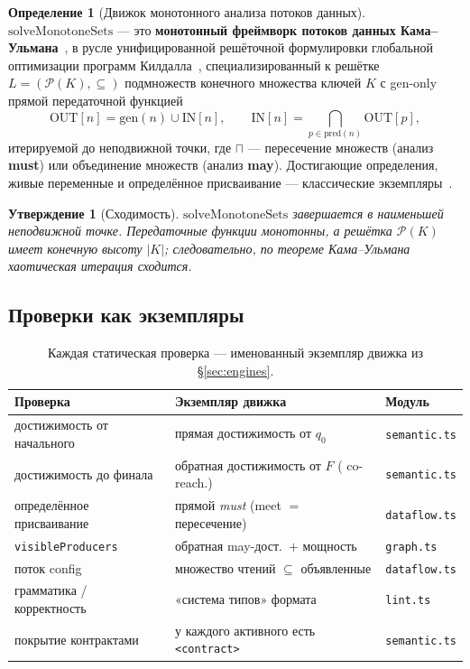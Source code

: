 \documentclass[11pt]{article}
\theoremstyle{plain}
\newtheorem{proposition}[theorem]{Утверждение}
\theoremstyle{definition}
\newtheorem{definition}[theorem]{Определение}
\theoremstyle{remark}
\newcommand{\code}[1]{\texttt{#1}}
\newcommand{\powerset}{\mathcal{P}}
\newcommand{\meet}{\sqcap}
\newcommand{\bigmeet}{\bigcap}
\begin{document}
\begin{definition}[Движок монотонного анализа потоков данных]\label{def:kamullman}
$\mathrm{solveMonotoneSets}$ --- это \textbf{монотонный фреймворк потоков данных
Кама--Ульмана}~\cite{kamullman}, в русле унифицированной решёточной формулировки
глобальной оптимизации программ Килдалла~\cite{kildall}, специализированный к решётке
$L = (\powerset(K), \subseteq)$ подмножеств конечного множества ключей $K$ с
gen-only прямой передаточной функцией
\[
  \mathrm{OUT}[n] = \mathrm{gen}(n) \cup \mathrm{IN}[n], \qquad
  \mathrm{IN}[n] = \!\!\bigmeet_{p \in \mathrm{pred}(n)}\!\! \mathrm{OUT}[p],
\]
итерируемой до неподвижной точки, где $\meet$ --- пересечение множеств (анализ
\textbf{must}) или объединение множеств (анализ \textbf{may}). Достигающие определения,
живые переменные и определённое присваивание --- классические
экземпляры~\cite{dragon,nielson}.
\end{definition}

\begin{proposition}[Сходимость]\label{prop:converge}
$\mathrm{solveMonotoneSets}$ завершается в наименьшей неподвижной точке. Передаточные
функции монотонны, а решётка $\powerset(K)$ имеет конечную высоту $|K|$; следовательно, по
теореме Кама--Ульмана хаотическая итерация сходится.
\end{proposition}

\subsection{Проверки как экземпляры}

\begin{table}[h]
\centering
\small
\begin{tabular}{@{}lll@{}}
\toprule
\textbf{Проверка} & \textbf{Экземпляр движка} & \textbf{Модуль} \\
\midrule
достижимость от начального  & прямая достижимость от $q_0$              & \code{semantic.ts} \\
достижимость до финала      & обратная достижимость от $F$ ( co-reach.) & \code{semantic.ts} \\
определённое присваивание   & прямой \emph{must} (meet $=$ пересечение)& \code{dataflow.ts} \\
\code{visibleProducers}     & обратная may-дост.\ $+$ мощность          & \code{graph.ts} \\
поток config                & множество чтений $\subseteq$ объявленные  & \code{dataflow.ts} \\
грамматика / корректность   & «система типов» формата                   & \code{lint.ts} \\
покрытие контрактами        & у каждого активного есть \code{<contract>}& \code{semantic.ts} \\
\bottomrule
\end{tabular}
\caption{Каждая статическая проверка --- именованный экземпляр движка из \S\ref{sec:engines}.}
\label{tab:checks}
\end{table}
\end{document}
